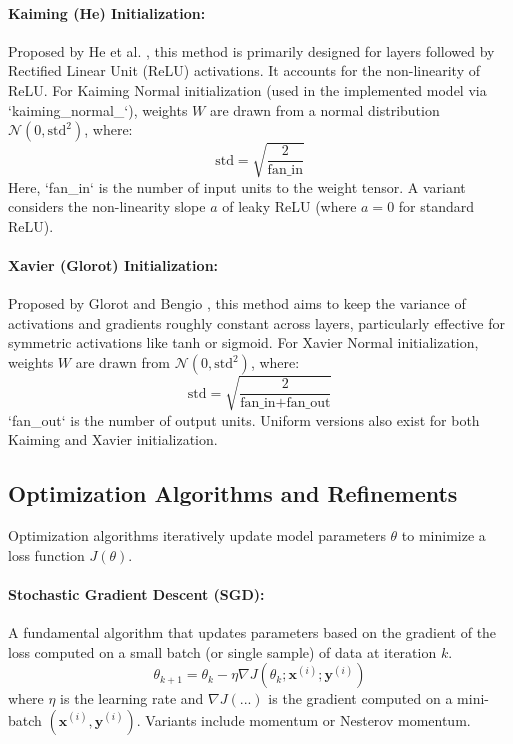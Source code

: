 \paragraph{Kaiming (He) Initialization:}
Proposed by He et al. \autocite{he2015delving}, this method is primarily designed for layers followed by Rectified Linear Unit (ReLU) activations. It accounts for the non-linearity of ReLU. For Kaiming Normal initialization (used in the implemented model via `kaiming_normal_`), weights \( W \) are drawn from a normal distribution \( \mathcal{N}(0, \text{std}^2) \), where:
\begin{equation}
  \text{std} = \sqrt{\frac{2}{\text{fan\_in}}}
\end{equation}
Here, `fan_in` is the number of input units to the weight tensor. A variant considers the non-linearity slope \( a \) of leaky ReLU (where \( a=0 \) for standard ReLU).

\paragraph{Xavier (Glorot) Initialization:}
Proposed by Glorot and Bengio \autocite{glorot2010understanding}, this method aims to keep the variance of activations and gradients roughly constant across layers, particularly effective for symmetric activations like tanh or sigmoid. For Xavier Normal initialization, weights \( W \) are drawn from \( \mathcal{N}(0, \text{std}^2) \), where:
\begin{equation}
  \text{std} = \sqrt{\frac{2}{\text{fan\_in} + \text{fan\_out}}}
\end{equation}
`fan_out` is the number of output units. Uniform versions also exist for both Kaiming and Xavier initialization.

\subsection{Optimization Algorithms and Refinements}
Optimization algorithms iteratively update model parameters \( \theta \) to minimize a loss function \( J(\theta) \).

\paragraph{Stochastic Gradient Descent (SGD):}
A fundamental algorithm that updates parameters based on the gradient of the loss computed on a small batch (or single sample) of data at iteration \( k \).
\begin{equation}
  \theta_{k+1} = \theta_k - \eta \nabla J(\theta_k; \bm{x}^{(i)}; \bm{y}^{(i)})
\end{equation}
where \( \eta \) is the learning rate and \( \nabla J(...) \) is the gradient computed on a mini-batch \( (\bm{x}^{(i)}, \bm{y}^{(i)}) \). Variants include momentum or Nesterov momentum.

